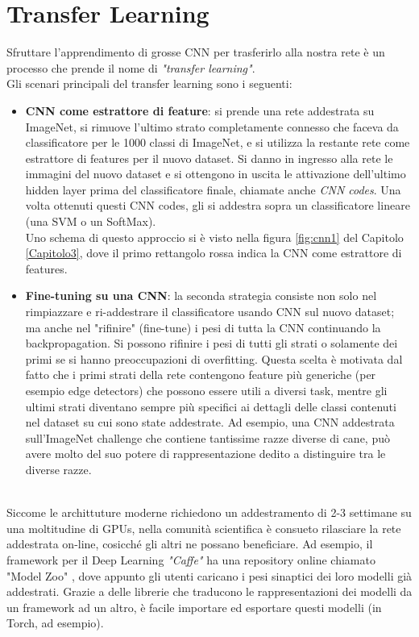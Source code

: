 \section{Transfer Learning}
Sfruttare l'apprendimento di grosse CNN per trasferirlo alla nostra rete è un processo che prende il nome di \emph{"transfer learning"}. \\
Gli scenari principali del transfer learning sono i seguenti: 
\begin{itemize}	
\item \textbf{CNN come estrattore di feature}: si prende una rete addestrata su ImageNet, si rimuove l'ultimo strato completamente connesso che faceva da classificatore per le 1000 classi di ImageNet, e si utilizza la restante rete come estrattore di features per il nuovo dataset. Si danno in ingresso alla rete le immagini del nuovo dataset e si ottengono in uscita le attivazione dell'ultimo hidden layer prima del classificatore finale, chiamate anche \emph{CNN codes}. Una volta ottenuti questi CNN codes, gli si addestra sopra un classificatore lineare (una SVM o un SoftMax).
\\
Uno schema di questo approccio si è visto nella figura \ref{fig:cnn1} del Capitolo \ref{Capitolo3}, dove il primo rettangolo rossa indica la CNN come estrattore di features. 
\item \textbf{Fine-tuning su una CNN}: la seconda strategia consiste non solo nel rimpiazzare e ri-addestrare il classificatore usando CNN sul nuovo dataset; ma anche nel "rifinire" (fine-tune) i pesi di tutta la CNN continuando la backpropagation. Si possono rifinire i pesi di tutti gli strati o solamente dei primi se si hanno preoccupazioni di overfitting. Questa scelta è motivata dal fatto che i primi strati della rete contengono feature più generiche (per esempio edge detectors) che possono essere utili a diversi task, mentre gli ultimi strati diventano sempre più specifici ai dettagli delle classi contenuti nel dataset su cui sono state addestrate. Ad esempio, una CNN addestrata sull'ImageNet challenge che contiene tantissime razze diverse di cane, può avere molto del suo potere di rappresentazione dedito a distinguire tra le diverse razze. 
\end{itemize} \\
Siccome le archittuture moderne richiedono un addestramento di 2-3 settimane su una moltitudine di GPUs, nella comunità scientifica è consueto rilasciare la rete addestrata on-line, cosicché gli altri ne possano beneficiare. Ad esempio, il framework per il Deep Learning \emph{"Caffe"} ha una repository online chiamato "Model Zoo" \parencite{Wzoo}, dove appunto gli utenti caricano i pesi sinaptici dei loro modelli già addestrati. Grazie a delle librerie che traducono le rappresentazioni dei modelli da un framework ad un altro, è facile importare ed esportare questi modelli (in Torch, ad esempio).   

